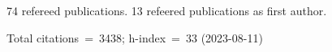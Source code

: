 74 refereed publications. 13 refeered publications as first author.

Total citations~=~3438; h-index~=~33 (2023-08-11)